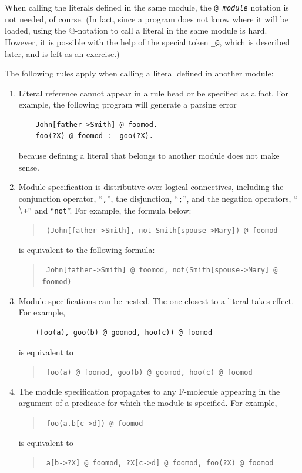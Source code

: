 \documentclass[11pt]{article}
\makeatletter
\newcommand{\thismodule}{{\tt \_@}\xspace}
\newcommand{\NAF}{\mbox{\tt \ensuremath{\tt\backslash}+}\xspace}
\newcommand{\TNOT}{{{\tt not}}\xspace}
\makeatother
\begin{document}
When calling the literals defined in the same module, the {\tt @{\it
    module}} notation is not needed, of course. (In fact, since a program
does not know where it will be loaded, using the @-notation to call a
literal in the same module is hard. However, it is possible with the help
of the special token \thismodule, which is described later, and is left
as an exercise.)

The following rules apply when calling a literal defined in another module:
\begin{enumerate}
\item Literal reference cannot appear in a rule head or be specified as
  a fact. For example, the following program will generate
  a parsing error
  \begin{verbatim}
    John[father->Smith] @ foomod.
    foo(?X) @ foomod :- goo(?X).
  \end{verbatim}
  because defining a literal that belongs to another module does not make
  sense.
  
\item Module specification is distributive over logical connectives,
  including the conjunction operator, ``\verb|,|'', the disjunction,
  ``\verb|;|'', and the negation operators, ``\NAF'' and
  ``\TNOT''. For example, the formula below:
  \begin{quote}
    {\tt
    (John[father->Smith], \TNOT Smith[spouse->Mary]) @ foomod
    }
  \end{quote}
  is equivalent to the following formula:
  \begin{quote}
    {\tt
    John[father->Smith] @ foomod, \TNOT (Smith[spouse->Mary] @ foomod)
    }
  \end{quote}

\item Module specifications can be nested. The one closest to a literal
  takes effect. For example,
  \begin{verbatim}
    (foo(a), goo(b) @ goomod, hoo(c)) @ foomod
  \end{verbatim}
  is equivalent to
  \begin{quote}
    {\tt
      foo(a) @ foomod, goo(b) @ goomod, hoo(c) @ foomod
    }
  \end{quote}
  
\item The module specification propagates to any F-molecule appearing
  in the argument of a predicate for which the module is
  specified. For example,
  \begin{quote}
    {\tt
    foo(a.b[c->d]) @ foomod
    }
  \end{quote}
  is equivalent to
  \begin{quote}
    {\tt
    a[b->?X] @ foomod, ?X[c->d] @ foomod, foo(?X) @ foomod
    }
  \end{quote}
  

\end{enumerate}
\end{document}
